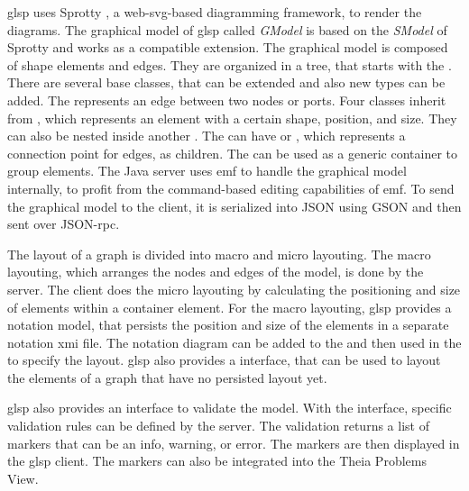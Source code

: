   \ac{glsp} uses Sprotty \cite{sprotty-repo}, a web-\acs{svg}-based diagramming framework, to render the diagrams. The graphical model of \ac{glsp} called \textit{GModel} is based on the \textit{SModel} of Sprotty and works as a compatible extension. The graphical model is composed of shape elements and edges. They are organized in a tree, that starts with the . There are several base classes, that can be extended and also new types can be added. The  represents an edge between two nodes or ports. Four classes inherit from , which represents an element with a certain shape, position, and size. They can also be nested inside another . The  can have  or , which represents a connection point for edges, as children. The  can be used as a generic container to group elements. The Java server uses \ac{emf} to handle the graphical model internally, to profit from the command-based editing capabilities of \ac{emf}. To send the graphical model to the client, it is serialized into JSON using GSON \cite{gson-repo} and then sent over JSON-\acs{rpc}. \cite{glsp-doc}

  The layout of a graph is divided into macro and micro layouting.
  The macro layouting, which arranges the nodes and edges of the model, is done by the server. The client does the micro layouting by calculating the positioning and size of elements within a container element. \cite{glsp-doc} For the macro layouting, \ac{glsp} provides a notation model, that persists the position and size of the elements in a separate notation \ac{xmi} file. The notation diagram can be added to the  and then used in the  to specify the layout. \cite{glsp-repo} \ac{glsp} also provides a  interface, that can be used to layout the elements of a graph that have no persisted layout yet. \cite{glsp-doc}

  \ac{glsp} also provides an interface to validate the model. With the  interface, specific validation rules can be defined by the server. The validation returns a list of markers that can be an info, warning, or error. The markers are then displayed in the \ac{glsp} client. The markers can also be integrated into the Theia Problems View.
